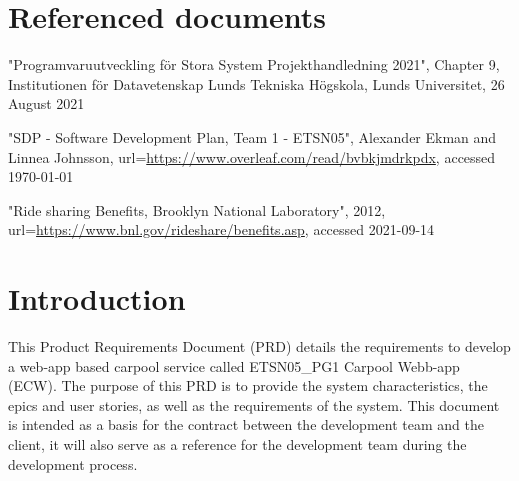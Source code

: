 \documentclass{article}
\newcommand{\nameNospace}{ECW}
\begin{document}
\section{Referenced documents}
\begin{thebibliography}{widest entry}

     "Programvaruutveckling för Stora System Projekthandledning 2021", Chapter 9, Institutionen för Datavetenskap Lunds Tekniska Högskola, Lunds Universitet, 26 August 2021
    
     "SDP - Software Development Plan, Team 1 - ETSN05", Alexander Ekman and Linnea Johnsson, url=\url{https://www.overleaf.com/read/bvbkjmdrkpdx}, accessed \today
    
     "Ride sharing Benefits, Brooklyn National Laboratory", 2012, url=\url{https://www.bnl.gov/rideshare/benefits.asp}, accessed 2021-09-14
    
\end{thebibliography}

\section{Introduction}\label{sec:intro}
This Product Requirements Document (PRD) details the requirements to develop a web-app based carpool service called ETSN05\_PG1 Carpool Webb-app (\nameNospace). The purpose of this PRD is to provide the system characteristics, the epics and user stories, as well as the requirements of the system. This document is intended as a basis for the contract between the development team and the client, it will also serve as a reference for the development team during the development process.
\end{document}
